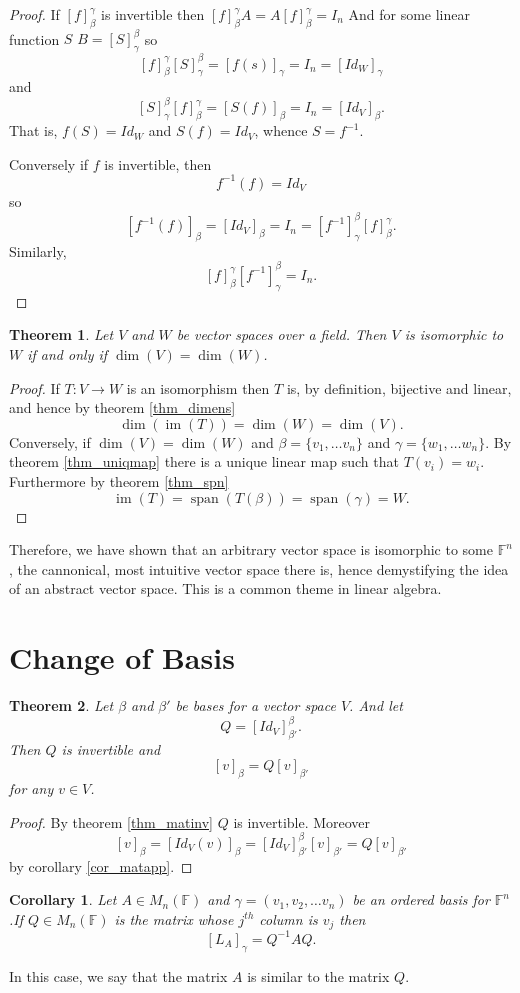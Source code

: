 \documentclass[oneside, 12pt]{book}
\DeclareMathOperator{\spn}{span}
\DeclareMathOperator{\im}{im}
\newtheorem{thm}{Theorem}[section]
\newtheorem{cor}{Corollary}[section]
\theoremstyle{definition}
\begin{document}
\begin{proof}
  If $[f]_{\beta}^{\gamma}$ is invertible then $[f]_{\beta}^{\gamma}A=A[f]_{\beta}^{\gamma}=I_{n}$ And for some linear function $S$ $B=[S]_{\gamma}^{\beta}$ so
  \[[f]_{\beta}^{\gamma}[S]_{\gamma}^{\beta}=[f(s)]_{\gamma}=I_{n}=[Id_{W}]_{\gamma}\] and \[[S]_{\gamma}^{\beta}[f]_{\beta}^{\gamma}=[S(f)]_{\beta}=I_{n}=[Id_{V}]_{\beta}.\]
  That is, $f(S)=Id_{W}$ and $S(f)=Id_{V}$, whence $S=f^{-1}$.

  Conversely if $f$ is invertible, then \[f^{-1}(f)=Id_{V}\] so \[[f^{-1}(f)]_{\beta}=[Id_{V}]_{\beta}=I_{n}=[f^{-1}]_{\gamma}^{\beta}[f]_{\beta}^{\gamma}.\]Similarly, \[[f]_{\beta}^{\gamma}[f^{-1}]_{\gamma}^{\beta}=I_{n}.\]
\end{proof}
\begin{thm}
  \label{thm_iso}
  Let $V$ and $W$ be vector spaces over a field. Then $V$ is isomorphic to $W$ if and only if $\dim(V)=\dim(W)$.
\end{thm}
\begin{proof}
  If $T:V \to W$ is an isomorphism then $T$ is, by definition, bijective and linear, and hence by theorem \ref{thm_dimens}
  \[\dim(\im(T))=\dim(W)=\dim(V).\] Conversely, if $\dim(V)=\dim(W)$ and $\beta=\{v_{1}, \dots v_{n}\}$ and $\gamma =\{w_{1}, \dots w_{n}\}$. By theorem \ref{thm_uniqmap} there is a unique linear map such that $T(v_{i})=w_{i}$. Furthermore by theorem \ref{thm_spn} \[\im(T)=\spn(T(\beta))=\spn(\gamma)=W.\]
\end{proof}
Therefore, we have shown that an arbitrary vector space is isomorphic to some $\mathbb{F}^{n}$, the cannonical, most intuitive vector space there is, hence demystifying the idea of an abstract vector space. This is a common theme in linear algebra.


\section{Change of Basis}
\begin{thm}
  \label{thm_chbase}
  Let $\beta$ and $\beta'$ be bases for a vector space $V$. And let \[Q=[Id_{V}]_{\beta'}^{\beta}.\]
  Then $Q$ is invertible and \[[v]_{\beta}=Q[v]_{\beta'}\] for any $v \in V$.
\end{thm}
\begin{proof}
  By theorem \ref{thm_matinv} $Q$ is invertible. Moreover \[[v]_{\beta}=[Id_{V}(v)]_{\beta}=[Id_{V}]_{\beta'}^{\beta}[v]_{\beta'}=Q[v]_{\beta'}\] by corollary \ref{cor_matapp}.
\end{proof}
\begin{cor}
  \label{cor_chbas}
Let $A \in M_{n}(\mathbb{F})$ and $\gamma=(v_{1}, v_{2}, \dots v_{n})$ be an ordered basis for $\mathbb{F}^{n}$.If $Q \in M_{n}(\mathbb{F})$ is the matrix whose $j^{th}$ column is $v_{j}$ then \[[L_{A}]_{\gamma}=Q^{-1}AQ.\]
\end{cor}
In this case, we say that the matrix $A$ is similar to the matrix $Q$.
\end{document}
